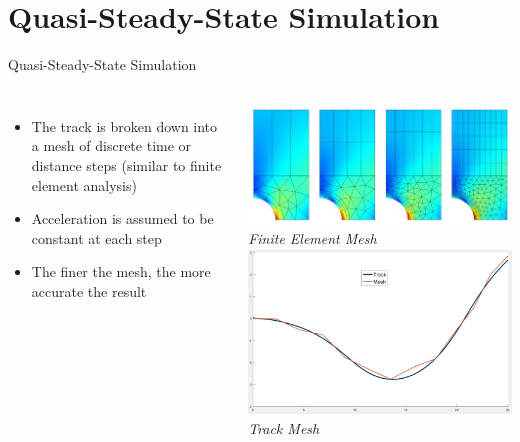 \section*{Quasi-Steady-State Simulation}

\begin{frame}{Quasi-Steady-State Simulation}
    \begin{columns}
        \begin{itemize}
            \item The track is broken down into a mesh of discrete time or distance steps (similar to finite element analysis)
            \item Acceleration is assumed to be constant at each step
            \item The finer the mesh, the more accurate the result
        \end{itemize}
        \centering
        \includegraphics[width=\textwidth]{res/Finite Element Mesh.jpg} \\
        \textit{Finite Element Mesh} \\
        \vspace{2ex}
        \includegraphics[width=\textwidth]{res/Track Mesh.png} \\
        \textit{Track Mesh}
    \end{columns}
\end{frame}


